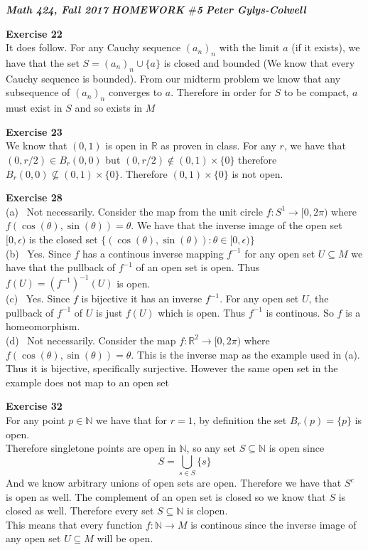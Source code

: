\documentclass[12pt]{article}
\newenvironment{ques}[1]{\textbf{Exercise #1}\vspace{1 mm}\\ }{\bigskip}
\theoremstyle{definition}
\newcommand{\R}{\mathbb R}
\newcommand{\N}{\mathbb N}
\newcommand{\s}{\sin}
\renewcommand{\c}{\cos}
\renewcommand{\t}{\theta}
\begin{document}
\noindent \textit{\textbf{Math 424, Fall 2017}} \hspace{1.3cm}
\textit{\textbf{HOMEWORK $\#$5}} \hspace{1.3cm} \textit{\textbf{Peter
Gylys-Colwell}} 

\vspace{1cm}

\begin{ques}{22}
	It does follow. For any Cauchy sequence $(a_n)_n$ with the limit $a$ (if it
	exists), we have that the set $S = (a_n)_n \cup \{a\}$ is closed and
	bounded (We know that every Cauchy sequence is bounded). From our midterm
	problem we know that any subsequence of $(a_n)_n$ converges to $a$.
	Therefore in order for $S$ to be compact, $a$ must exist in $S$ and so
	exists in $M$
\end{ques}

\begin{ques}{23}
	We know that $(0,1)$ is open in $\R$ as proven in class. For any $r$, we
	have that $(0,r/2) \in B_r(0,0)$ but $(0,r/2) \notin (0,1) \times \{0\}$
	therefore $B_r(0,0) \not \subseteq (0,1) \times \{0\}$. Therefore $(0,1)
	\times \{0\}$ is not open.
\end{ques}


\begin{ques}{28}
	(a) \ Not necessarily. Consider the map from the unit circle $f : S^1 \to
	[0, 2\pi)$ where $f(\c(\t), \s(\t)) = \t$. We have that the inverse image
	of the open set $[0,\epsilon)$ is the closed set $\{(\c(\t),\s(\t)): \t \in
	[0, \epsilon)\}$\\
	(b) \ Yes. Since $f$ has a continous inverse mapping $f^{-1}$ for any open
	set $U \subseteq M$ we have that the pullback of $f^{-1}$ of an open set is
	open. Thus $f(U) = (f^{-1})^{-1}(U)$ is open.\\
	(c) \ Yes. Since $f$ is bijective it has an inverse $f^{-1}$. For any open
	set $U$, the pullback of $f^{-1}$ of $U$ is just $f(U)$ which is open. Thus
	$f^{-1}$ is continous. So $f$ is a homeomorphism. \\
	(d) \ Not necessarily. Consider the map  $f :\R^2 \to [0, 2\pi)$ where
	$f(\c(\t), \s(\t)) = \t$. This is the inverse map as the example used in
	(a). Thus it is bijective, specifically surjective. However the same open
	set in the example does not map to an open set

\end{ques}

\begin{ques}{32}
	For any point $p \in \N$ we have that for $r = 1$, by definition the set
	$B_r(p) = \{p\}$ is open.\\
	Therefore singletone points are open in $\N$, so any set $S \subseteq \N$
	is open since
	$$S = \bigcup_{s \in S} \{s\}$$
	And we know arbitrary unions of open sets are open. Therefore we have that
	$S^{c}$ is open as well. The complement of an open set is closed so we know
	that $S$ is closed as well. Therefore every set $S \subseteq \N$ is clopen.\\
	This means that every function $f: \N \to M$ is continous since the inverse
	image of any open set $U \subseteq M$ will be open.
\end{ques}
\end{document}
